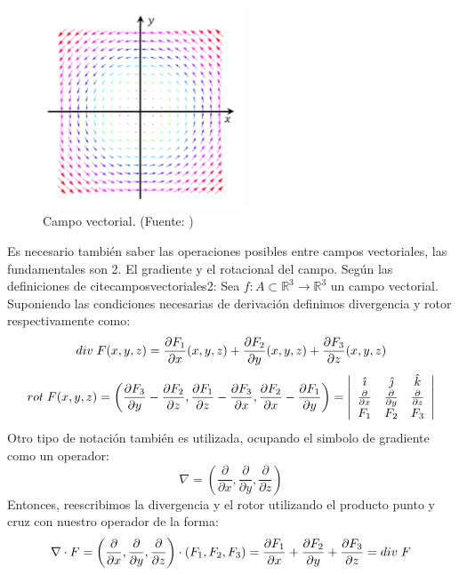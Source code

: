 \begin{figure}[H]
\centering
\includegraphics[height=6cm]{Imagenes/campoveccolor.png}
\caption{Campo vectorial. (Fuente: \cite{camposvectoriales})}\label{fig:Campo vectorial en colores}
\end{figure}
Es necesario también saber las operaciones posibles entre campos vectoriales, las fundamentales son 2. El gradiente y el rotacional del campo. Según las definiciones de cite{camposvectoriales2}:
Sea $f:A\subset \mathbb{R}^3\rightarrow \mathbb{R}^3$ un campo vectorial. Suponiendo las condiciones necesarias de derivación definimos divergencia y rotor respectivamente como:
\begin{equation*} 
\mathnormal{div}\;F(x,y,z)=\frac{\partial F_1}{\partial x}(x,y,z)+\frac{\partial F_2}{\partial y}(x,y,z)+\frac{\partial F_3}{\partial z}(x,y,z)
\end{equation*}
\begin{equation*}
\mathnormal{rot}\;F(x,y,z)=\left(\frac{\partial F_3}{\partial y}-\frac{\partial F_2}{\partial z},\frac{\partial F_1}{\partial z}-\frac{\partial F_3}{\partial x},\frac{\partial F_2}{\partial x}-\frac{\partial F_1}{\partial y}\right)=  \left| {\begin{array}{ccc}
   \hat{\imath} & \hat{\jmath} & \hat{k} \\
   \frac{\partial}{\partial x} & \frac{\partial}{\partial y} & \frac{\partial}{\partial z} \\
   F_1 & F_2 & F_3 \\
  \end{array} } \right|
\end{equation*}
Otro tipo de notación también es utilizada, ocupando el simbolo de gradiente como un operador:
$$\nabla = \left(\frac{\partial}{\partial x},\frac{\partial}{\partial y},\frac{\partial}{\partial z}\right)$$
Entonces, reescribimos la divergencia y el rotor utilizando el producto punto y cruz con nuestro operador de la forma:
$$\nabla \cdot F = \left(\frac{\partial}{\partial x},\frac{\partial}{\partial y},\frac{\partial}{\partial z}\right) \cdot \left(F_1,F_2,F_3\right)=\frac{\partial F_1}{\partial x}+\frac{\partial F_2}{\partial y}+\frac{\partial F_3}{\partial z}=\mathnormal{div}\;F$$
